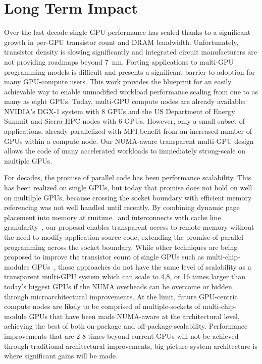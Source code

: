 \documentclass{sig-alternate}
\begin{document}
\vspace{-.05in}
\section{Long Term Impact} Over the last decade single GPU performance has 
scaled thanks to a significant growth in per-GPU transistor count and DRAM 
bandwidth. Unfortunately, transistor density is slowing significantly and 
integrated circuit manufacturers are not providing roadmaps beyond \SI{7}{nm}.
Porting applications to multi-GPU programming models is difficult and presents
a significant barrier to adoption for many GPU-compute users.  This work provides
the blueprint for an easily achievable way to enable unmodified workload performance
scaling from one to as many as eight GPUs.
Today, multi-GPU compute nodes are already available: NVIDIA's DGX-1 
system with 8 GPUs and the US Department of Energy Summit and Sierra HPC 
nodes with 6 GPUs. However, only a small subset of applications, 
already parallelized with MPI benefit from an increased number of GPUs within a compute
node. Our NUMA-aware transparent multi-GPU design allows the code of many accelerated 
workloads to immediately strong-scale on multiple GPUs.\@

For decades, the promise of parallel code has been performance scalability. 
This has been realized on single GPUs, but today that promise does not hold on 
well on multilple GPUs, because crossing the socket boundary with efficient memory referencing 
was not well handled until recently. By combining dynamic page placement into memory at 
runtime~\cite{UVM} and interconnects with cache line granularity~\cite{NVLINK}, 
our proposal enables transparent access to remote memory without the need to 
modify application source code, extending the promise of parallel programming across
the socket boundary.  While other techniques are being proposed to improve the transistor
count of single GPUs such as multi-chip-modules GPUs~\cite{Arunkumar2017}, those
approaches do not have the same level of scalability as a transparent multi-GPU
system which can scale to 4,8, or 16 times larger than today's biggest GPUs if
the NUMA overheads can be overcome or hidden through microarchitectural improvements.
At the limit, future GPU-centric compute nodes are likely to be comprised of multiple-sockets
of multi-chip-module GPUs that have been made NUMA-aware at the architectural level, achieving
the best of both on-package and off-package scalability.  Performance
improvements that are 2-8 times beyond current GPUs will not be achieved through traditional
architectural improvements, big picture system architecture is where significant gains
will be made.
\end{document}
